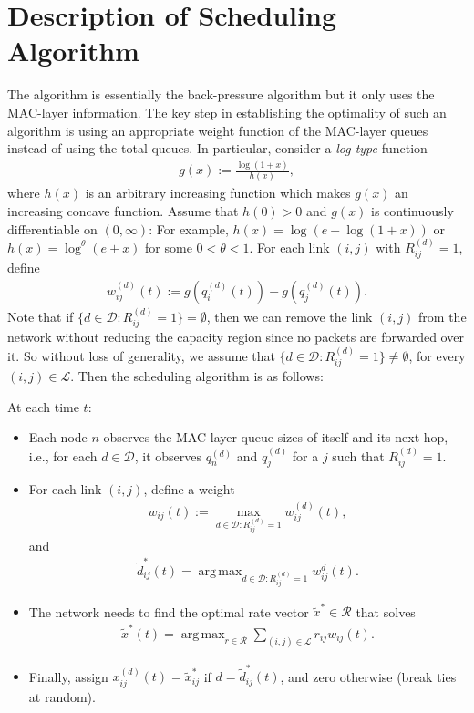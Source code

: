 \documentclass[10pt,onecolumn,draftclsnofoot,journal]{IEEEtran}
\DeclareMathOperator*{\argmax}{arg\,max}
\newcommand{\mD} {\mathcal{D}}
\newcommand{\be}{\begin{eqnarray}}
\newcommand{\ee}{\end{eqnarray}}
\begin{document}
\section{Description of Scheduling Algorithm}\label{sec:algorithm}
The algorithm is essentially the back-pressure algorithm \cite{eph} but it only uses the MAC-layer information.
The key step in establishing the optimality of such an algorithm is using an appropriate weight function of the MAC-layer queues instead of using the total queues. In particular,
consider a \textit{log-type} function
\be \label{function}
g(x):=\frac{\log(1+x)}{h(x)},
\ee
where $h(x)$ is an arbitrary increasing function which makes
$g(x)$ an increasing concave function. Assume that $h(0) > 0$
and $g(x)$ is continuously differentiable on $(0, \infty)$: For example, $h(x)=\log(e+\log(1+x))$ or $h(x)=\log^\theta(e+x)$ for some $0 <\theta < 1$.
For each link $(i,j)$ with $R^{(d)}_{ij}=1$, define
\be \label{diff log}
w_{ij}^{(d)}(t):=g(q_i^{(d)}(t))-g(q_j^{(d)}(t)).
\ee
Note that if $\{d\in \mD :R^{(d)}_{ij}=1\}=\emptyset$, then we can remove the link $(i,j)$ from the network without reducing the capacity region since no packets are forwarded over it. So without loss of generality, we assume that $\{d\in \mD :R^{(d)}_{ij}=1\}\neq \emptyset$, for every $(i,j) \in \mathcal{L}$.
Then the scheduling algorithm is as follows:

At each time $t$:
\begin{itemize}
\item Each node $n$ observes the MAC-layer queue sizes of itself and its next hop, i.e., for each $d\in \mathcal{D}$, it observes $q_n^{(d)}$ and $q_j^{(d)}$ for a $j$ such that $R^{(d)}_{ij}=1$.

\item For each link $(i,j)$, define a weight
\be \label{eq: link weight}
w_{ij}(t):= \max_{d\in \mD :R^{(d)}_{ij}=1} w_{ij}^{(d)}(t),
\ee
and
\be \label{eq: dtilde}
\tilde{d}^*_{ij}(t)=\argmax_{d\in \mD :R^{(d)}_{ij}=1} w_{ij}^{d}(t).
\ee

\item The network needs to find the optimal rate vector $\tilde{x}^* \in \mathcal{R}$ that solves
\be \label{eq: xstartilde}
\tilde{x}^*(t)=\argmax_{r \in \mathcal{R}} \sum _{(i,j) \in \mathcal{L}}r_{ij}w_{ij}(t).
\ee
\item Finally, assign $x_{ij}^{(d)}(t)=\tilde{x}^*_{ij}$ if $d={\tilde{d}}^*_{ij}(t)$, and zero otherwise (break ties at random).
\end{itemize}
\end{document}
